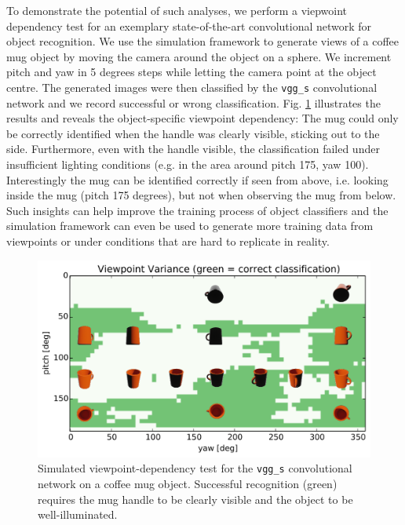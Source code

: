 \documentclass[letterpaper, 10 pt, conference]{ieeeconf}  %
\begin{document}
To demonstrate the potential of such analyses, we perform a viepwoint dependency test for an exemplary state-of-the-art convolutional network for object recognition. We use the simulation framework to generate views of a coffee mug object by moving the camera around the object on a sphere. We increment pitch and yaw in 5 degrees steps while letting the camera point at the object centre. The generated images were then classified by the \texttt{vgg\_s} convolutional network \cite{Chatfield14} and we record successful or wrong classification. Fig. \ref{fig:obj-recognition} illustrates the results and reveals the object-specific viewpoint dependency: The mug could only be correctly identified when the handle was clearly visible, sticking out to the side. Furthermore, even with the handle visible, the classification failed under insufficient lighting conditions (e.g. in the area around pitch 175, yaw 100). Interestingly the mug can be identified correctly if seen from above, i.e. looking inside the mug (pitch 175 degrees), but not when observing the mug from below. Such insights can help improve the training process of object classifiers and the simulation framework can even be used to generate more training data from viewpoints or under conditions that are hard to replicate in reality.



\begin{figure}[t]
    \includegraphics[width=\linewidth]{object_recognition.pdf}
    \caption{Simulated viewpoint-dependency test for the \texttt{vgg\_s} convolutional network \cite{Chatfield14} on a coffee mug object. Successful recognition (green) requires the mug handle to be clearly visible and the object to be well-illuminated.}
    \label{fig:obj-recognition}
\end{figure}
\end{document}
